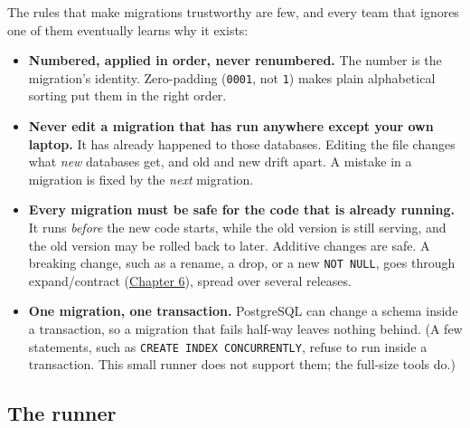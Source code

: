 \noindent{}The rules that make migrations trustworthy are few, and every team that ignores one of them eventually learns why it exists:

\begin{itemize}
\tightlist
\item
  \textbf{Numbered, applied in order, never renumbered.} The number is the migration's identity. Zero-padding (\texttt{0001}, not \texttt{1}) makes plain alphabetical sorting put them in the right order.
\item
  \textbf{Never edit a migration that has run anywhere except your own laptop.} It has already happened to those databases. Editing the file changes what \emph{new} databases get, and old and new drift apart. A mistake in a migration is fixed by the \emph{next} migration.
\item
  \textbf{Every migration must be safe for the code that is already running.} It runs \emph{before} the new code starts, while the old version is still serving, and the old version may be rolled back to later. Additive changes are safe. A breaking change, such as a rename, a drop, or a new \texttt{NOT\ NULL}, goes through expand/contract (\hyperref[ch:06-local-dependencies]{Chapter 6}), spread over several releases.
\item
  \textbf{One migration, one transaction.} PostgreSQL can change a schema inside a transaction, so a migration that fails half-way leaves nothing behind. (A few statements, such as \texttt{CREATE\ INDEX\ CONCURRENTLY}, refuse to run inside a transaction. This small runner does not support them; the full-size tools do.)
\end{itemize}

\subsection*{The runner}\label{33-logic-execution:the-runner}

